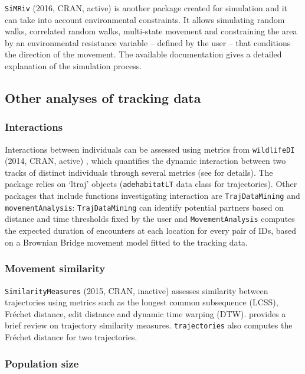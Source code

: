 \documentclass[a4paper,12pt]{article}
\newcommand{\Rpkg}[1]{\texttt{#1}}
\begin{document}
	\Rpkg{SiMRiv} (2016, CRAN, active) \citep{RSiMRiv} is another package created for simulation and it can take into account environmental constraints. It allows simulating random walks, correlated random walks, multi-state movement and constraining the area by an environmental resistance variable -- defined by the user -- that conditions the direction of the movement. The available documentation gives a detailed explanation of the simulation process. 
	
	\subsection*{Other analyses of tracking data}
	
	\subsubsection*{Interactions}
	
	Interactions between individuals can be assessed using metrics from \Rpkg{wildlifeDI} (2014, CRAN, active) \citep{RwildlifeDI}, which quantifies the dynamic interaction between two tracks of distinct individuals through several metrics (see \cite{Long2014} for details). The package relies on `ltraj' objects (\Rpkg{adehabitatLT} data class for trajectories). Other packages that include functions investigating interaction are \Rpkg{TrajDataMining} and \Rpkg{movementAnalysis}: \Rpkg{TrajDataMining} can identify potential partners based on distance and time thresholds fixed by the user and \Rpkg{MovementAnalysis} computes the expected duration of encounters at each location for every pair of IDs, based on a Brownian Bridge movement model fitted to the tracking data. 
	
	\subsubsection*{Movement similarity}
	
	\Rpkg{SimilarityMeasures} (2015, CRAN, inactive) \citep{RSimilarityMeasures} assesses similarity between trajectories using metrics such as the longest common subsequence (LCSS), Fr\'echet distance, edit distance and dynamic time warping (DTW). \cite{Magdy2015} provides a brief review on trajectory similarity measures. \Rpkg{trajectories} also computes the Fr\'echet distance for two trajectories. 
	
	\subsubsection*{Population size}
	
\end{document}
